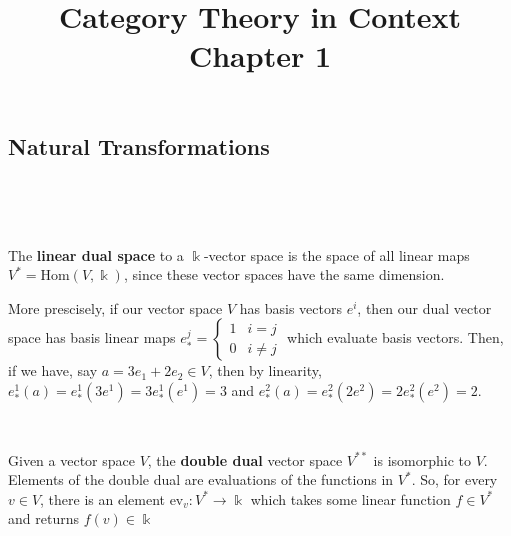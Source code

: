 \documentclass{article}
\title{Category Theory in Context Chapter 1}
\begin{document}
\maketitle

\setcounter{section}{1}
\setcounter{subsection}{3}
\subsection{Natural Transformations}
\

\begin{definition}
\

The \textbf{linear dual space} to a $\Bbbk$-vector space is the space of all linear maps $V^* = \text{Hom}(V, \Bbbk)$, since these vector spaces have the same dimension.

More prescisely, if our vector space $V$ has basis vectors $e^i$, then our dual vector space has basis linear maps $e_*^j = \begin{cases}
    1 & i = j \\ 0 & i \neq j
\end{cases}$ which evaluate basis vectors. Then, if we have, say $a = 3e_1 + 2e_2 \in V$, then by linearity, $e^1_*(a) = e^1_*(3e^1) = 3e^1_*(e^1) = 3$ and $e^2_*(a) = e^2_*(2e^2) = 2e^2_*(e^2) = 2$.
\end{definition}

\begin{definition}
\

Given a vector space $V$, the \textbf{double dual} vector space $V^{**}$ is isomorphic to $V$. Elements of the double dual are evaluations of the functions in $V^*$. So, for every $v \in V$, there is an element $\text{ev}_v: V^* \to \Bbbk$ which takes some linear function $f \in V^*$ and returns $f(v) \in \Bbbk$
\end{definition}
\end{document}
